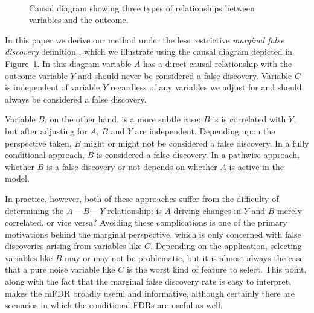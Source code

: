 \begin{figure}[!htb]
\centering
{} \\
\caption{\label{Fig:diagram} Causal diagram showing three types of relationships between variables and the outcome.}
\end{figure}

In this paper we derive our method under the less restrictive \textit{marginal false discovery} definition \citep{BrehenyMFDR}, which we illustrate using the causal diagram depicted in Figure~\ref{Fig:diagram}. In this diagram variable $A$ has a direct causal relationship with the outcome variable $Y$ and should never be considered a false discovery. Variable $C$ is independent of variable $Y$ regardless of any variables we adjust for and should always be considered a false discovery. 

Variable $B$, on the other hand, is a more subtle case: $B$ is is correlated with $Y$, but after adjusting for $A$, $B$ and $Y$ are independent. Depending upon the perspective taken, $B$ might or might not be considered a false discovery. In a fully conditional approach, $B$ is considered a false discovery.  In a pathwise approach, whether $B$ is a false discovery or not depends on whether $A$ is active in the model.

In practice, however, both of these approaches suffer from the difficulty of determining the $A-B-Y$ relationship: is $A$ driving changes in $Y$ and $B$ merely correlated, or vice versa?  Avoiding these complications is one of the primary motivations behind the marginal perspective, which is only concerned with false discoveries arising from variables like $C$.  Depending on the application, selecting variables like $B$ may or may not be problematic, but it is almost always the case that a pure noise variable like $C$ is the worst kind of feature to select.  This point, along with the fact that the marginal false discovery rate is easy to interpret, makes the mFDR broadly useful and informative, although certainly there are scenarios in which the conditional FDRs are useful as well.

